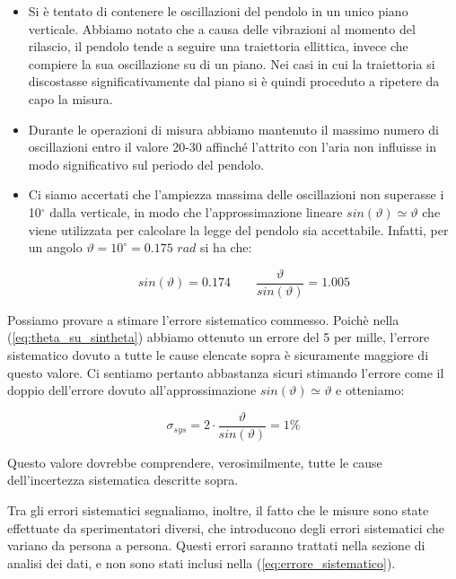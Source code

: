 \begin{itemize}
    \item{Si è tentato di contenere le oscillazioni del pendolo in un
        unico piano verticale. Abbiamo notato che a causa delle
        vibrazioni al momento del rilascio, il pendolo tende a seguire una
        traiettoria ellittica, invece che compiere la sua oscillazione su di un piano.
        Nei casi in cui la traiettoria si discostasse significativamente dal piano
        si è quindi proceduto a ripetere da capo la misura.}
    
    \item{Durante le operazioni di misura abbiamo mantenuto il massimo numero
        di oscillazioni entro il valore 20-30 affinché l'attrito con l'aria
        non influisse in modo significativo sul periodo del pendolo.}

    \item{Ci siamo accertati che l'ampiezza massima delle
        oscillazioni non superasse i 10$^\circ$ dalla verticale, in modo che
        l'approssimazione lineare $sin(\vartheta) \simeq \vartheta$ che viene
        utilizzata per calcolare la legge del pendolo sia accettabile. Infatti, per un
        angolo $\vartheta = 10^\circ = 0.175 \,\, rad$ si ha che:}

    \begin{equation}
        sin(\vartheta) = 0.174 \qquad \frac{\vartheta}{sin(\vartheta)} = 1.005
        \label{eq:theta_su_sintheta}
    \end{equation}

\end{itemize}

Possiamo provare a stimare l'errore sistematico commesso. Poichè nella (\ref{eq:theta_su_sintheta})
abbiamo ottenuto un errore del 5 per mille, l'errore sistematico dovuto a tutte le
cause elencate sopra è sicuramente maggiore di questo valore. Ci sentiamo pertanto abbastanza
sicuri stimando l'errore come il doppio dell'errore dovuto all'approssimazione $sin(\vartheta) \simeq \vartheta$ e otteniamo:

\begin{equation}
    \sigma_{sys} = 2 \cdot \frac{\vartheta}{sin(\vartheta)} = 1 \%
    \label{eq:errore_sistematico}
\end{equation}

Questo valore dovrebbe comprendere, verosimilmente, tutte le cause dell'incertezza sistematica descritte sopra.

Tra gli errori sistematici segnaliamo, inoltre, il fatto che le misure sono state
effettuate da sperimentatori diversi, che introducono degli errori sistematici
che variano da persona a persona. Questi errori saranno trattati nella sezione
di analisi dei dati, e non sono stati inclusi nella (\ref{eq:errore_sistematico}).

